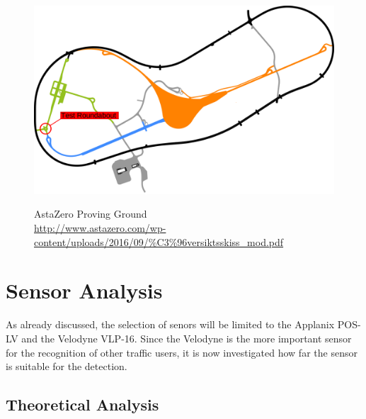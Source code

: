 \documentclass[11pt,oneside,openright]{mpreport}
\begin{document}
\begin{figure}[!ht]
\caption{AstaZero Proving Ground\\ \url{http://www.astazero.com/wp-content/uploads/2016/09/\%C3\%96versiktsskiss_mod.pdf} }
\includegraphics[width=\textwidth]{bilder/AstaZero.pdf}
\label{astazero}
\end{figure}


\chapter{Sensor Analysis}

As already discussed, the selection of senors will be limited to the Applanix POS-LV and the Velodyne VLP-16. Since the Velodyne is the more
important sensor for the recognition of other traffic users, it is now investigated how far the sensor is suitable for the detection.

\section{Theoretical Analysis}
\end{document}
